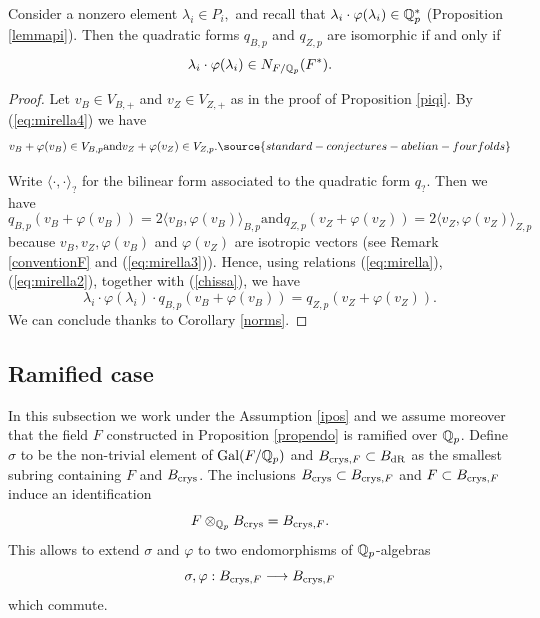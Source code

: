 \begin{prop}
\notready\label{warmbrinon}
Consider a nonzero element $\lambda_i \in P_i,$ and recall that $\lambda_i \cdot\varphi(\lambda_i) \in \mathbb{Q}^*_p$ (Proposition \ref{lemmapi}).  Then the quadratic forms $q_{B,p}$ and $q_{Z,p}$ are isomorphic if and only if
 \[\lambda_i \cdot\varphi(\lambda_i) \in N_{F/\mathbb{Q}_p}(F^*).\]
\end{prop}
\begin{proof}
Let $v_B \in V_{B,+}$ and $v_Z \in V_{Z,+}$ as in the proof of Proposition \ref{piqi}.  By (\ref{eq:mirella4}) we have
\begin{equation} \label{eq:mirella9}v_B + \varphi(v_{B})  \in  V_{B,p}   \textrm{and}     v_Z + \varphi(v_{Z})  \in  V_{Z,p}.
\source{standard-conjectures-abelian-fourfolds}
\end{equation}

Write  $\langle \cdot  ,  \cdot \rangle_{?}$ for the bilinear form associated to the quadratic form $q_?$. Then we have
\[q_{B,p}(v_B + \varphi(v_{B}) ) = 2 \langle v_B ,  \varphi(v_{B}) \rangle_{B,p}    \textrm{and}    q_{Z,p}(v_Z + \varphi(v_{Z}) ) = 2 \langle v_Z ,  \varphi(v_{Z}) \rangle_{Z,p}  \]
because    $v_B,v_Z,\varphi(v_B)$ and $\varphi(v_Z)$ are isotropic vectors (see Remark \ref{conventionF} and (\ref{eq:mirella3})).
Hence, using  relations  (\ref{eq:mirella}), (\ref{eq:mirella2}), together with (\ref{chissa}), we have
\[\lambda_i \cdot\varphi(\lambda_i) \cdot q_{B,p}(v_B + \varphi(v_{B}) ) =  q_{Z,p}(v_Z + \varphi(v_{Z}) ) . \]
We can conclude thanks to Corollary \ref{norms}.
\end{proof}

\subsection*{Ramified case}\label{ramcase}


In this subsection we work under the Assumption  \ref{ipos} and we assume moreover that the field $F$  constructed in  Proposition \ref{propendo} is ramified over $\mathbb{Q}_p$.
Define $\sigma$ to be the  non-trivial element of $\textnormal{Gal}(F/\mathbb{Q}_p)$ and $  B_{\textnormal{crys},F} \subset B_{\mathrm{dR}}$ as the smallest subring containing $F$ and  $B_{\textnormal{crys}}$.
The inclusions   $  B_{\textnormal{crys}} \subset B_{\textnormal{crys},F}$ and  $  F \subset B_{\textnormal{crys},F}$ induce an identification
\[F\otimes_{\mathbb{Q}_p} B_{\textnormal{crys}}=B_{\textnormal{crys},F}. \]
This allows  to extend $\sigma$ and $\varphi$ to two endomorphisms of $\mathbb{Q}_p$-algebras
\[   \sigma, \varphi : B_{\textnormal{crys},F}    \longrightarrow B_{\textnormal{crys},F} \]
which commute.

